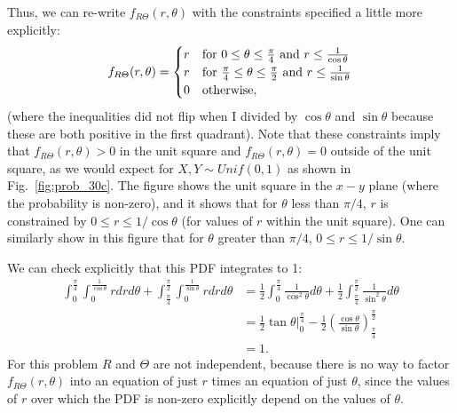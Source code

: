 \begin{problem}{30}
Thus, we can re-write $f_{R\Theta}(r, \theta)$ with the constraints specified a little more explicitly:
\[
 f_{R\Theta}(r, \theta) =
  \begin{cases}
                                  r & \text{for $0 \le \theta \le \frac{\pi}{4}$ and $r \le \frac{1}{\cos \theta}$}  \\
                                   r & \text{for $ \frac{\pi}{4} \le \theta \le \frac{\pi}{2}$ and $r \le \frac{1}{\sin \theta}$}  \\
                                    0 & \text {otherwise},
   \end{cases}
\]
(where the inequalities did not flip when I divided by $\cos \theta$ and $\sin \theta$ because these are both positive in the first quadrant). Note that these constraints imply that $f_{R\Theta}(r, \theta) >0 $ in the unit square and $f_{R\Theta}(r, \theta) =0 $ outside of the unit square, as we would expect for $X, Y \sim Unif(0,1)$ as shown in Fig.~\ref{fig:prob_30c}.  The figure shows the unit square in the $x-y$ plane (where the probability is non-zero), and it shows that for $\theta$ less than $\pi/4$, $r$ is constrained by $0\le r \le 1/ \cos \theta$ (for values of $r$ within the unit square).  One can similarly show in this figure that for $\theta $ greater than $\pi/4$, $0\le r \le 1/ \sin \theta$.

We can check explicitly that this PDF integrates to 1:
\begin{align*}
\int_0^{\frac{\pi}{4}} \int_0^{\frac{1}{\cos \theta}} r dr d\theta+\int_{\frac{\pi}{4}}^{\frac{\pi}{2}} \int_0^{\frac{1}{\sin \theta}} r dr d\theta &= \frac{1}{2}\int_0^{\frac{\pi}{4}}  \frac{1}{\cos^2 \theta}d\theta+\frac{1}{2}\int_{\frac{\pi}{4}}^{\frac{\pi}{2}}\frac{1}{\sin^2 \theta}d\theta \\
&=\frac{1}{2} \tan{\theta}\Big|_0^{\frac{\pi}{4}} -\frac{1}{2} \left(\frac{\cos \theta}{\sin \theta}\right )_{{\frac{\pi}{4}}}^{\frac{\pi}{2}} \\
&=1.
\end{align*}
For this problem $R$ and $\Theta$ are not independent, because there is no way to factor $f_{R\Theta}(r, \theta)$ into an equation of just $r$ times an equation of just $\theta$, since the values of $r$ over which the PDF is non-zero explicitly depend on the values of $\theta$.


\end{problem}
